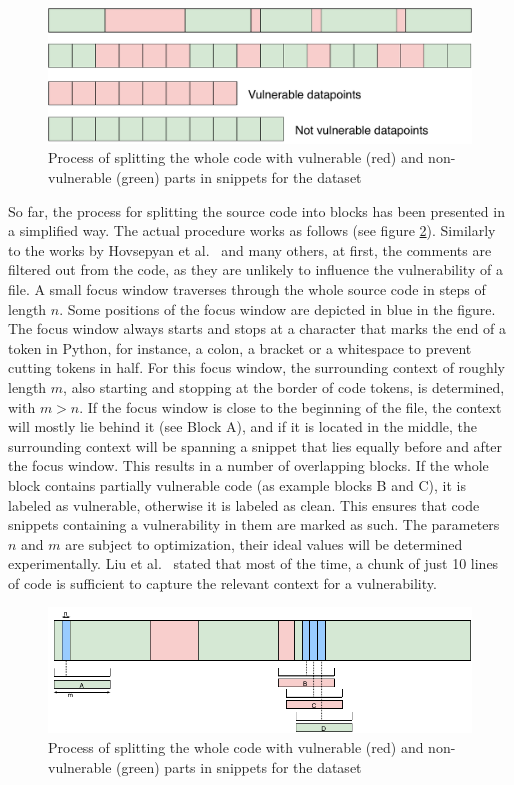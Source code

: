 \documentclass[
a4paper,
pagesize,
pdftex,
12pt,
ngerman,
fleqn,
final,
]{scrartcl}
\begin{document}
	\begin{figure}[ht]
		\centering
		\includegraphics[width=0.8\linewidth]{img/collectData2}
		\caption{Process of splitting the whole code with vulnerable (red) and non-vulnerable (green) parts in snippets for the dataset}
		\label{fig:collectData2}
	\end{figure}
	
	So far, the process for splitting the source code into blocks has been presented in a simplified way. The actual procedure works as follows (see figure \ref{fig:FocusBlocks}).
	Similarly to the works by Hovsepyan et al.~\cite{Hovsepyan.2012} and many others, at first, the comments are filtered out from the code, as they are unlikely to influence the vulnerability of a file. A small focus window traverses through the whole source code in steps of length $n$. Some positions of the focus window are depicted in blue in the figure. The focus window always starts and stops at a character that marks the end of a token in Python, for instance, a colon, a bracket or a whitespace to prevent cutting tokens in half. For this focus window, the surrounding context of roughly length $m$, also starting and stopping at the border of code tokens, is determined, with $m > n$. If the focus window is close to the beginning of the file, the context will mostly lie behind it (see Block A), and if it is located in the middle, the surrounding context will be spanning a snippet that lies equally before and after the focus window. This results in a number of overlapping blocks. If the whole block contains partially vulnerable code (as example blocks B and C), it is labeled as vulnerable, otherwise it is labeled as clean. This ensures that code snippets containing a vulnerability in them are marked as such. The parameters $n$ and $m$ are subject to optimization, their ideal values will be determined experimentally. Liu et al.~\cite{Liu.2018} stated that most of the time, a chunk of just 10 lines of code is sufficient to capture the relevant context for a vulnerability.
	
	\begin{figure}[ht]
		\centering
		\includegraphics[width=0.9\linewidth]{img/FocusBlocks}
		\caption{Process of splitting the whole code with vulnerable (red) and non-vulnerable (green) parts in snippets for the dataset}
		\label{fig:FocusBlocks}
	\end{figure}
	
\end{document}
